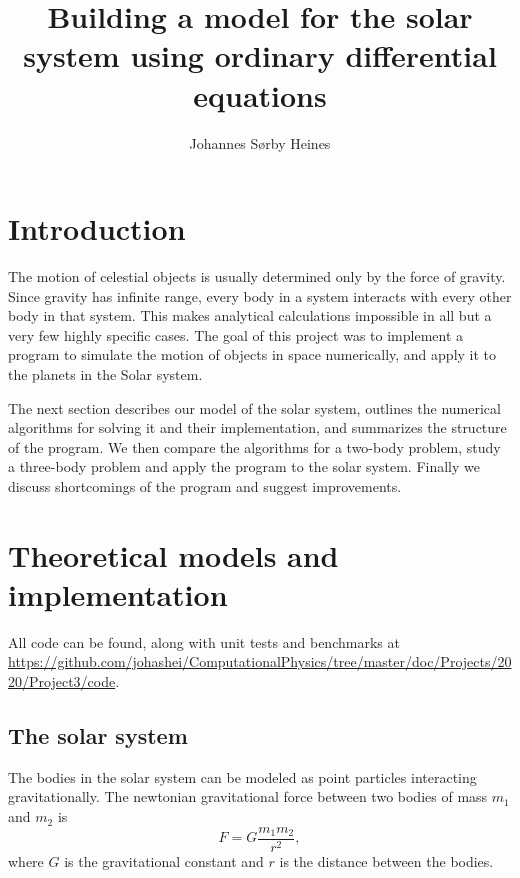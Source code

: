 \documentclass[a4paper,10pt,twocolumn]{article}
\title{Building a model for the solar system using ordinary differential equations}
\author{Johannes Sørby Heines}
\begin{document}

\section*{Introduction}
The motion of celestial objects is usually determined only by the force of gravity. Since gravity has infinite range, every body in a system interacts with every other body in that system. This makes analytical calculations impossible in all but a very few highly specific cases. 
The goal of this project was to implement a program to simulate the motion of objects in space numerically, and apply it to the planets in the Solar system.

The next section describes our model of the solar system, outlines the numerical algorithms for solving it and their implementation, and summarizes the structure of the program.
We then compare the algorithms for a two-body problem, study a three-body problem and apply the program to the solar system. Finally we discuss shortcomings of the program and suggest improvements. 


%
%
%
\section*{Theoretical models and implementation}
All code can be found, along with unit tests and benchmarks at \url{https://github.com/johashei/ComputationalPhysics/tree/master/doc/Projects/2020/Project3/code}.

\subsection*{The solar system}
The bodies in the solar system can be modeled as point particles interacting gravitationally. 
The newtonian gravitational force between two bodies of mass $m_1$ and $m_2$ is
\[
F = G\frac{m_1m_2}{r^2},
\]
where $G$ is the gravitational constant and $r$ is the distance between the bodies.
\end{document}
